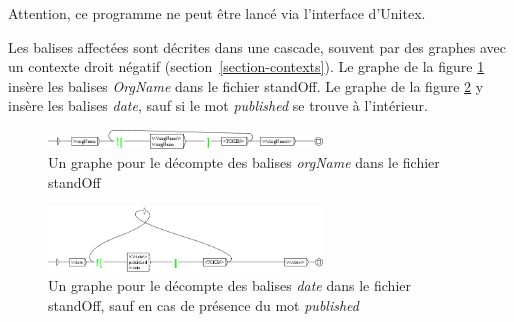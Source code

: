 \noindent Attention, ce programme ne peut être lancé via l'interface d'Unitex.


Les balises affectées sont décrites dans une cascade, souvent par des graphes avec un contexte droit négatif (section~\ref{section-contexts}). Le graphe de la figure \ref{standOffOrgName} insère les balises \emph{OrgName} dans le fichier standOff. Le graphe de la figure \ref{standOffDate} y insère les balises \emph{date}, sauf si le mot \emph{published} se trouve à l'intérieur.


\begin{figure}[!htb]
  \centering
  \includegraphics[width=7.28cm]{resources/img/grfOrgName.png}
  \caption{Un graphe pour le décompte des balises \emph{orgName} dans le fichier standOff}
  \label{standOffOrgName}
\end{figure}


\begin{figure}[!htb]
  \centering
  \includegraphics[width=7.28cm]{resources/img/grfDate.png}
  \caption{Un graphe pour le décompte des balises \emph{date} dans le fichier standOff, sauf en cas de présence du mot \emph{published}}
  \label{standOffDate}
\end{figure}

